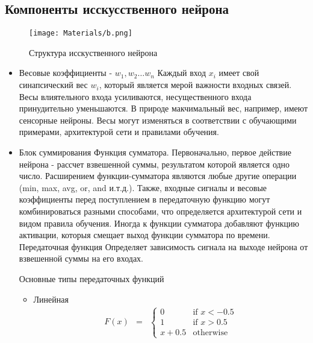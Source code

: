 		\subsection{Компоненты исскусственного нейрона}
		    \begin{figure}[h!]
                \centering
                \texttt{[image: Materials/b.png]}
                \caption{Структура исскуственного нейрона}
            \end{figure}
    		\begin{itemize}
    		        \item Весовые коэффициенты - $w_1, w_2 \dots w_n$
    				Каждый вход $x_i$ имеет свой синапсический вес $w_i$, который является мерой
    				важности входных связей. Весы влиятельного входа усиливаются, несущественного 
    				входа принудительно уменьшаются. В природе макчимальный вес, например, имеют сенсорные 
    				нейроны. Весы могут изменяться в соответствии с обучающими примерами, архитектурой сети 
    				и правилами обучения. 
    			    \item Блок суммирования
    				Функция сумматора. Первоначально, первое действие нейрона - рассчет взвешенной суммы, результатом
    				которой является одно число. Расширением функции-сумматора являются любые другие операции (min, max,
    				avg, or, and и.т.д.). Также, входные сигналы и весовые коэффициенты перед поступлением в передаточную 
    				функцию могут комбинироваться разными способами, что определяется архитектурой сети и видом правила
    				обучения.  Иногда к функции сумматора добавляют функцию активации, которыя смещает выход функции сумматора 
    				по времени. 
    			    Передаточная функция 
    				Определяет зависимость сигнала на выходе нейрона от взвешенной суммы на его входах.
    				
    				Основные типы передаточных функций
    				\begin{itemize}
    				\item Линейная
    					\begin{equation}
                            \begin{matrix}
                            F(x) & =
                            & \left\{
                            \begin{matrix}
                            0 & \mbox{if } x < -0.5\\
                            1 & \mbox{if } x > 0.5\\
                            x + 0.5 & \mbox{otherwise }
                            \end{matrix} \right.
                            \end{matrix}
                        \end{equation}
                        

\end{itemize}
\end{itemize}
